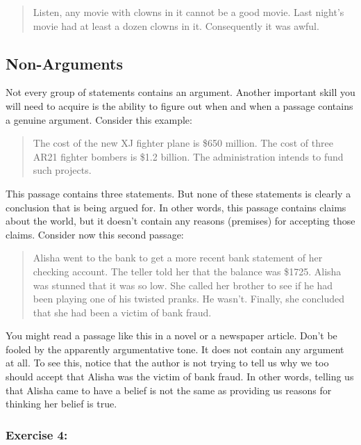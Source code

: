 \documentclass[]{article}
\begin{document}
\begin{quote}
Listen, any movie with clowns in it cannot be a good movie. Last night's
movie had at least a dozen clowns in it. Consequently it was awful.
\end{quote}

\subsection{Non-Arguments}\label{non-arguments}

Not every group of statements contains an argument. Another important
skill you will need to acquire is the ability to figure out when and
when a passage contains a genuine argument. Consider this example:

\begin{quote}
The cost of the new XJ fighter plane is \$650 million. The cost of three
AR21 fighter bombers is \$1.2 billion. The administration intends to
fund such projects.
\end{quote}

This passage contains three statements. But none of these statements is
clearly a conclusion that is being argued for. In other words, this
passage contains claims about the world, but it doesn't contain any
reasons (premises) for accepting those claims. Consider now this second
passage:

\begin{quote}
Alisha went to the bank to get a more recent bank statement of her
checking account. The teller told her that the balance was \$1725.
Alisha was stunned that it was so low. She called her brother to see if
he had been playing one of his twisted pranks. He wasn't. Finally, she
concluded that she had been a victim of bank fraud.
\end{quote}

You might read a passage like this in a novel or a newspaper article.
Don't be fooled by the apparently argumentative tone. It does not
contain any argument at all. To see this, notice that the author is not
trying to tell us why we too should accept that Alisha was the victim of
bank fraud. In other words, telling us that Alisha came to have a belief
is not the same as providing us reasons for thinking her belief is true.

\subsubsection{Exercise 4:}\label{exercise-4}
\end{document}
